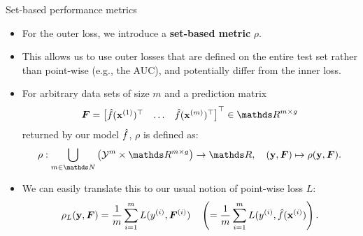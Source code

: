 
\begin{vbframe}{Set-based performance metrics}

\begin{itemize}
  \item For the outer loss, we introduce a \textbf{set-based metric} $\rho$.
  \item This allows us to use outer losses that are defined on the entire test 
  set rather than point-wise (e.g., the AUC), and potentially differ from the 
  inner loss.
  \item For arbitrary data sets of size $m$ and a prediction matrix 
  $$\F = \begin{bmatrix} \fh(\xi[1])^\top & \dots & \fh(\xi[m])^\top \end{bmatrix}^\top \in \R^{m \times g}$$ returned by our model $\hat{f}$, $\rho$ is defined as:
  $$\rho: \preimageRho  \rightarrow \R, \quad (\yv, \F) \mapsto \rho(\yv, \F).$$
  \item We can easily translate this to our usual notion of point-wise loss $L$:
  $$\rho_L(\mathbf{y}, \boldsymbol{F}) = \frac{1}{m}\sum\limits_{i=1}^m L(y^{(i)}, \boldsymbol{F}^{(i)})  \quad \left(= \frac{1}{m}\sum\limits_{i=1}^m L(y^{(i)}, \hat{f}(\mathbf{x}^{(i)})\right).$$
\end{itemize}

\end{vbframe}


